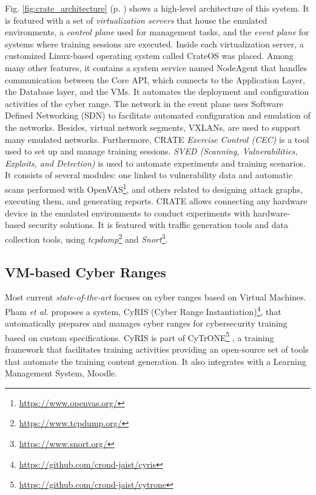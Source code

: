 Fig. \ref{fig:crate_architecture} (p. \pageref{fig:crate_architecture}) shows a high-level architecture of this system. It is featured with a set of \textit{virtualization servers} that house the emulated environments, a \textit{control plane} used for management tasks, and the \textit{event plane} for systems where training sessions are executed. Inside each virtualization server, a customized Linux-based operating system called CrateOS was placed. Among many other features, it contains a system service named NodeAgent that handles communication between the Core API, which connects to the Application Layer, the Database layer, and the VMs. It automates the deployment and configuration activities of the cyber range. The network in the event plane uses Software Defined Networking (SDN) to facilitate automated configuration and emulation of the networks. Besides, virtual network segments, VXLANs, are used to support many emulated networks. Furthermore, CRATE \textit{Exercise Control (CEC)} is a tool used to set up and manage training sessions. \textit{SVED (Scanning, Vulnerabilities, Exploits, and Detection)} is used to automate experiments and training scenarios. It consists of several modules: one linked to vulnerability data and automatic scans performed with OpenVAS\footnote{\url{https://www.openvas.org/}}, and others related to designing attack graphs, executing them, and generating reports. CRATE allows connecting any hardware device in the emulated environments to conduct experiments with hardware-based security solutions. It is featured with traffic generation tools and data collection tools, using \textit{tcpdump}\footnote{\url{https://www.tcpdump.org/}} and \textit{Snort}\footnote{\url{https://www.snort.org/}}.

\subsection{VM-based Cyber Ranges} \label{sec:vm_cr}


Most current \textit{state-of-the-art} focuses on cyber ranges based on Virtual Machines. Pham \textit{et al.} \cite{cyris_ref} proposes a system, CyRIS (Cyber Range Instantiation)\footnote{\url{https://github.com/crond-jaist/cyris}}, that automatically prepares and manages cyber ranges for cybersecurity training based on custom specifications. CyRIS is part of CyTrONE\footnote{\url{https://github.com/crond-jaist/cytrone}} \cite{cytrone_ref}, a training framework that facilitates training activities providing an open-source set of tools that automate the training content generation. It also integrates with a Learning Management System, Moodle. 

